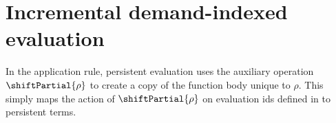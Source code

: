 \section{Incremental demand-indexed evaluation}





In the application rule, persistent evaluation uses the auxiliary operation
$\shiftPartial{\rho}$ to create a copy of the function body unique to $\rho$.
This simply maps the action of $\shiftPartial{\rho}$ on evaluation ids defined
in  to persistent terms.

